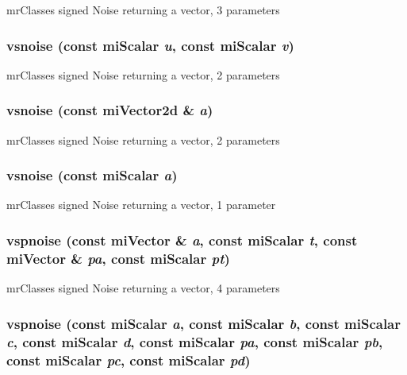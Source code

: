 mr\-Classes signed Noise returning a vector, 3 parameters 

\subsubsection{ vsnoise (const mi\-Scalar {\em u}, const mi\-Scalar {\em v})\hspace{0.3cm}{\tt  [inline]}}\label{namespacersl_a65}


mr\-Classes signed Noise returning a vector, 2 parameters 

\subsubsection{ vsnoise (const mi\-Vector2d \& {\em a})\hspace{0.3cm}{\tt  [inline]}}\label{namespacersl_a64}


mr\-Classes signed Noise returning a vector, 2 parameters 

\subsubsection{ vsnoise (const mi\-Scalar {\em a})\hspace{0.3cm}{\tt  [inline]}}\label{namespacersl_a63}


mr\-Classes signed Noise returning a vector, 1 parameter 

\subsubsection{ vspnoise (const mi\-Vector \& {\em a}, const mi\-Scalar {\em t}, const mi\-Vector \& {\em pa}, const mi\-Scalar {\em pt})\hspace{0.3cm}{\tt  [inline]}}\label{namespacersl_a97}


mr\-Classes signed Noise returning a vector, 4 parameters 

\subsubsection{ vspnoise (const mi\-Scalar {\em a}, const mi\-Scalar {\em b}, const mi\-Scalar {\em c}, const mi\-Scalar {\em d}, const mi\-Scalar {\em pa}, const mi\-Scalar {\em pb}, const mi\-Scalar {\em pc}, const mi\-Scalar {\em pd})\hspace{0.3cm}{\tt  [inline]}}\label{namespacersl_a96}


